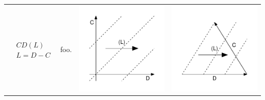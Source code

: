 \documentclass[
  12pt
]{scrartcl}
\begin{document}
\begin{center}
\begin{longtable}{m{}m{}m{}m{}}
  \midrule
  $$\begin{aligned}
    &CD(L) \\
    &L = D - C
  \end{aligned}$$ &
  foo. &
  \includegraphics[width = \linewidth]{../fig/CDl.pdf} &
  \includegraphics[width = \linewidth]{../fig/CDl_iso.pdf}  \\

\end{longtable}
\end{center}
\end{document}
